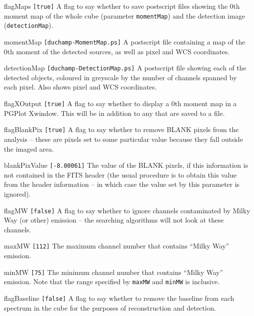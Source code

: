 \begin{entry}
\item[flagMaps \texttt{[true]}] A flag to say whether to save
  postscript files showing the 0th moment map of the whole cube
  (parameter \texttt{momentMap}) and the detection image
  (\texttt{detectionMap}).
\item[momentMap \texttt{[duchamp-MomentMap.ps]}] A postscript file
  containing a map of the 0th moment of the detected sources, as well
  as pixel and WCS coordinates.
\item[detectionMap \texttt{[duchamp-DetectionMap.ps]}] A postscript
  file showing each of the detected objects, coloured in greyscale by
  the number of channels spanned by each pixel. Also shows pixel and
  WCS coordinates.
\item[flagXOutput \texttt{[true]}] A flag to say whether to display a
  0th moment map in a PGPlot Xwindow. This will be in addition to any
  that are saved to a file.
\end{entry}

\begin{entry}
\item[flagBlankPix \texttt{[true]}] A flag to say whether to remove
  BLANK pixels from the analysis -- these are pixels set to some
  particular value because they fall outside the imaged area.
\item[blankPixValue \texttt{[-8.00061]}] The value of the BLANK
  pixels, if this information is not contained in the FITS header (the
  usual procedure is to obtain this value from the header information
  -- in which case the value set by this parameter is ignored).
\item[flagMW \texttt{[false]}] A flag to say whether to ignore
  channels contaminated by Milky Way (or other) emission -- the
  searching algorithms will not look at these channels.
\item[maxMW \texttt{[112]}] The maximum channel number that contains
  ``Milky Way'' emission.
\item[minMW \texttt{[75]}] The minimum channel number that contains
  ``Milky Way'' emission. Note that the range specified by
  \texttt{maxMW} and \texttt{minMW} is inclusive.
\item[flagBaseline \texttt{[false]}] A flag to say whether to remove
  the baseline from each spectrum in the cube for the purposes of
  reconstruction and detection.
\end{entry}


